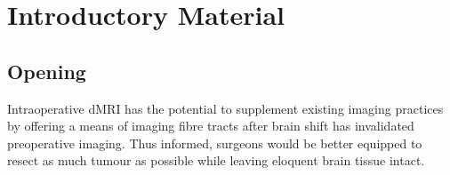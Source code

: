 \chapter{Introductory Material}
\label{chapterlabel0}

\section{Opening}


Intraoperative dMRI has the potential to supplement existing imaging practices by offering a means of imaging fibre tracts after brain shift has invalidated preoperative imaging.\autocite{Nimsky2001}
Thus informed, surgeons would be better equipped to resect as much tumour as possible while leaving eloquent brain tissue intact. 
